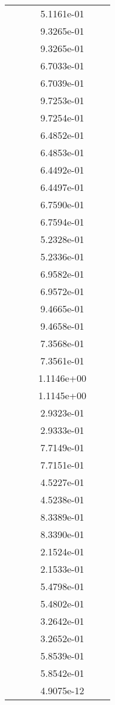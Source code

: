 \begin{xltabular}{\textwidth}{r|rS[table-format=1.3e+2]S[table-format=1.4e+2]S[table-format=1.4e+2]S[table-format=-1.5]}
&  &  & 5.1161e-01 & & \\
&  &  & 9.3265e-01 & & \\
&  &  & 9.3265e-01 & & \\
&  &  & 6.7033e-01 & & \\
&  &  & 6.7039e-01 & & \\
&  &  & 9.7253e-01 & & \\
&  &  & 9.7254e-01 & & \\
&  &  & 6.4852e-01 & & \\
&  &  & 6.4853e-01 & & \\
&  &  & 6.4492e-01 & & \\
&  &  & 6.4497e-01 & & \\
&  &  & 6.7590e-01 & & \\
&  &  & 6.7594e-01 & & \\
&  &  & 5.2328e-01 & & \\
&  &  & 5.2336e-01 & & \\
&  &  & 6.9582e-01 & & \\
&  &  & 6.9572e-01 & & \\
&  &  & 9.4665e-01 & & \\
&  &  & 9.4658e-01 & & \\
&  &  & 7.3568e-01 & & \\
&  &  & 7.3561e-01 & & \\
&  &  & 1.1146e+00 & & \\
&  &  & 1.1145e+00 & & \\
&  &  & 2.9323e-01 & & \\
&  &  & 2.9333e-01 & & \\
&  &  & 7.7149e-01 & & \\
&  &  & 7.7151e-01 & & \\
&  &  & 4.5227e-01 & & \\
&  &  & 4.5238e-01 & & \\
&  &  & 8.3389e-01 & & \\
&  &  & 8.3390e-01 & & \\
&  &  & 2.1524e-01 & & \\
&  &  & 2.1533e-01 & & \\
&  &  & 5.4798e-01 & & \\
&  &  & 5.4802e-01 & & \\
&  &  & 3.2642e-01 & & \\
&  &  & 3.2652e-01 & & \\
&  &  & 5.8539e-01 & & \\
&  &  & 5.8542e-01 & & \\
&  &  & 4.9075e-12 & & \\

\end{xltabular}
